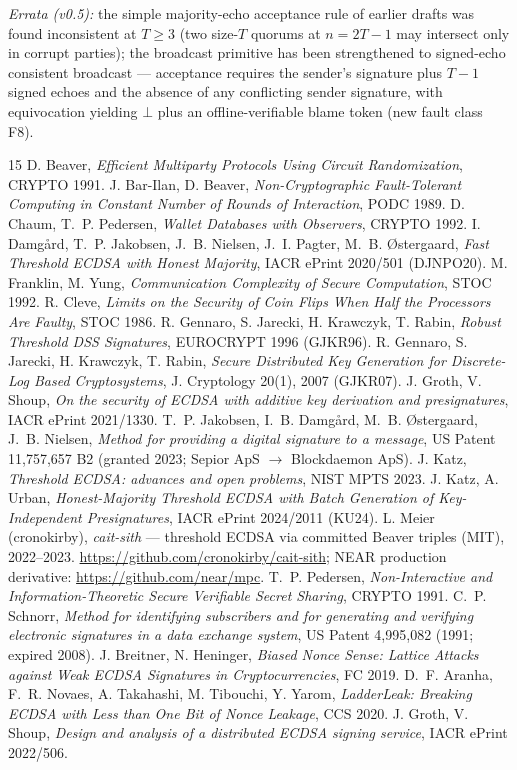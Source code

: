 \documentclass[11pt]{article}
\theoremstyle{plain}
\theoremstyle{definition}
\theoremstyle{remark}
\begin{document}
\emph{Errata (v0.5):} the simple majority-echo acceptance rule of earlier drafts was found inconsistent at $T \geq 3$ (two size-$T$ quorums at $n = 2T{-}1$ may intersect only in corrupt parties); the broadcast primitive has been strengthened to signed-echo consistent broadcast --- acceptance requires the sender's signature plus $T{-}1$ signed echoes and the absence of any conflicting sender signature, with equivocation yielding $\bot$ plus an offline-verifiable blame token (new fault class F8).

\begin{thebibliography}{15}\small
{} D. Beaver, \emph{Efficient Multiparty Protocols Using Circuit Randomization}, CRYPTO 1991.
 J. Bar-Ilan, D. Beaver, \emph{Non-Cryptographic Fault-Tolerant Computing in Constant Number of Rounds of Interaction}, PODC 1989.
 D. Chaum, T.~P. Pedersen, \emph{Wallet Databases with Observers}, CRYPTO 1992.
 I. Damg\aa rd, T.~P. Jakobsen, J.~B. Nielsen, J.~I. Pagter, M.~B. \O stergaard, \emph{Fast Threshold ECDSA with Honest Majority}, IACR ePrint 2020/501 (DJNPO20).
 M. Franklin, M. Yung, \emph{Communication Complexity of Secure Computation}, STOC 1992.
 R. Cleve, \emph{Limits on the Security of Coin Flips When Half the Processors Are Faulty}, STOC 1986.
 R. Gennaro, S. Jarecki, H. Krawczyk, T. Rabin, \emph{Robust Threshold DSS Signatures}, EUROCRYPT 1996 (GJKR96).
 R. Gennaro, S. Jarecki, H. Krawczyk, T. Rabin, \emph{Secure Distributed Key Generation for Discrete-Log Based Cryptosystems}, J. Cryptology 20(1), 2007 (GJKR07).
 J. Groth, V. Shoup, \emph{On the security of ECDSA with additive key derivation and presignatures}, IACR ePrint 2021/1330.
 T.~P. Jakobsen, I.~B. Damg\aa rd, M.~B. \O stergaard, J.~B. Nielsen, \emph{Method for providing a digital signature to a message}, US Patent 11,757,657 B2 (granted 2023; Sepior ApS $\to$ Blockdaemon ApS).
 J. Katz, \emph{Threshold ECDSA: advances and open problems}, NIST MPTS 2023.
 J. Katz, A. Urban, \emph{Honest-Majority Threshold ECDSA with Batch Generation of Key-Independent Presignatures}, IACR ePrint 2024/2011 (KU24).
 L. Meier (cronokirby), \emph{cait-sith} --- threshold ECDSA via committed Beaver triples (MIT), 2022--2023. \url{https://github.com/cronokirby/cait-sith}; NEAR production derivative: \url{https://github.com/near/mpc}.
 T.~P. Pedersen, \emph{Non-Interactive and Information-Theoretic Secure Verifiable Secret Sharing}, CRYPTO 1991.
 C.~P. Schnorr, \emph{Method for identifying subscribers and for generating and verifying electronic signatures in a data exchange system}, US Patent 4,995,082 (1991; expired 2008).
 J. Breitner, N. Heninger, \emph{Biased Nonce Sense: Lattice Attacks against Weak ECDSA Signatures in Cryptocurrencies}, FC 2019.
 D.~F. Aranha, F.~R. Novaes, A. Takahashi, M. Tibouchi, Y. Yarom, \emph{LadderLeak: Breaking ECDSA with Less than One Bit of Nonce Leakage}, CCS 2020.
 J. Groth, V. Shoup, \emph{Design and analysis of a distributed ECDSA signing service}, IACR ePrint 2022/506.
\end{thebibliography}
\end{document}
